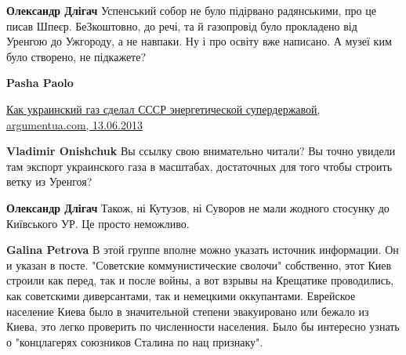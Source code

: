 \begin{itemize}
\begin{itemize}
\begin{itemize}
\textbf{Олександр Длігач} Успенський собор не було підірвано радянськими, про
це писав Шпеєр. БеЗкоштовно, до речі, та й газопровід було прокладено від
Уренгою до Ужгороду, а не навпаки. Ну і про освіту вже написано. А музеї ким
було створено, не підкажете?

 
\textbf{Pasha Paolo}

\href{http://argumentua.com/stati/kak-ukrainskii-gaz-sdelal-sssr-energeticheskoi-superderzhavoi}{%
Как украинский газ сделал СССР энергетической супердержавой, argumentua.com, 13.06.2013%
}

 
\textbf{Vladimir Onishchuk} Вы ссылку свою внимательно читали? Вы точно увидели
там экспорт украинского газа в масштабах, достаточных для того чтобы строить
ветку из Уренгоя?


 
\textbf{Олександр Длігач} Також, ні Кутузов, ні Суворов не мали жодного стосунку до Київського УР. Це просто неможливо.

 
\textbf{Galina Petrova} В этой группе вполне можно указать источник информации. Он и указан в посте. "Советские коммунистические сволочи" собственно, этот Киев строили как перед, так и после войны, а вот взрывы на Крещатике проводились, как советскими диверсантами, так и немецкими оккупантами. Еврейское население Киева было в значительной степени эвакуировано или бежало из Киева, это легко проверить по численности населения. Было бы интересно узнать о "концлагерях союзников Сталина по нац признаку".


\end{itemize}
\end{itemize}
\end{itemize}
